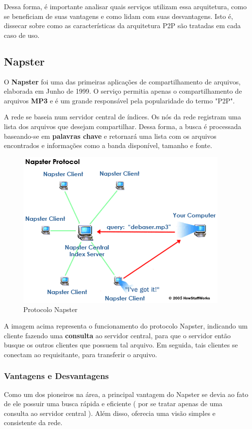 \documentclass[a4paper]{article}
\begin{document}
Dessa forma, é importante analisar quais serviços utilizam essa arquitetura, como se beneficiam de suas vantagens e como lidam com suas desvantagens. Isto é, dissecar sobre como as características da arquitetura P2P são tratadas em cada caso de uso.

\subsection{Napster}
O \textbf{Napster} foi uma das primeiras aplicações de compartilhamento de arquivos, elaborada em Junho de 1999. O serviço permitia apenas o compartilhamento de arquivos \textbf{MP3} e é um grande responsável pela popularidade do termo "P2P".

A rede se baseia num servidor central de índices. Os nós da rede registram uma lista dos arquivos que desejam compartilhar. Dessa forma, a busca é processada baseando-se em \textbf{palavras chave} e retornará uma lista com os arquivos encontrados e informações como a banda disponível, tamanho e fonte. 

\begin{figure}[ht]
\begin{center}
  \includegraphics[scale=0.5]{img//ilustracaoiot.png} 
  \caption{Protocolo Napster \cite{howstuffworks} \label{figure1}}
\end{center}
\end{figure}

A imagem acima representa o funcionamento do protocolo Napster, indicando um cliente fazendo uma \textbf{consulta} ao servidor central, para que o servidor então busque os outros clientes que possuem tal arquivo. Em seguida, tais clientes se conectam ao requisitante, para transferir o arquivo.

\subsubsection{Vantagens e Desvantagens}
Como um dos pioneiros na área, a principal vantagem do Napster se devia ao fato de ele possuir uma busca rápida e eficiente ( por se tratar apenas de uma consulta ao servidor central ). Além disso, oferecia uma visão simples e consistente da rede. 
\end{document}
